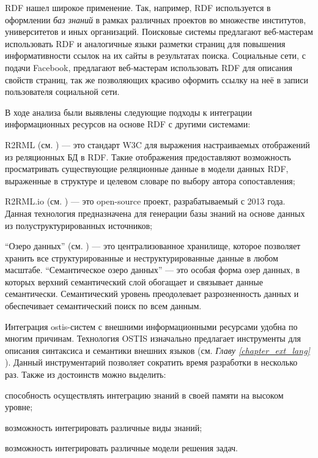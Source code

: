 RDF нашел широкое применение. Так, например, RDF используется в оформлении \textit{баз знаний} в рамках различных проектов во множестве институтов, университетов и иных организаций. Поисковые системы предлагают веб-мастерам использовать RDF и аналогичные языки разметки страниц для повышения информативности ссылок на их сайты в результатах поиска. Социальные сети, с подачи Facebook, предлагают веб-мастерам использовать RDF для описания свойств страниц, так же позволяющих красиво оформить ссылку на неё в записи пользователя социальной сети.

В ходе анализа были выявлены следующие подходы к интеграции информационных ресурсов на основе RDF с другими системами:
\begin{textitemize}
    \item R2RML (см. ) --- это стандарт W3C для выражения настраиваемых отображений из реляционных БД в RDF. Такие отображения предоставляют возможность просматривать существующие реляционные данные в модели данных RDF, выраженные в структуре и целевом словаре по выбору автора сопоставления;
    \item R2RML.io (см. ) --- это open-source проект, разрабатываемый с 2013 года. Данная технология предназначена для генерации базы знаний на основе данных из полуструктурированных источников;
    \item ``Озеро данных'' (см. ) --- это централизованное хранилище, которое позволяет хранить все структурированные и неструктурированные данные в любом масштабе. ``Семантическое озеро данных'' --- это особая форма озер данных, в которых верхний семантический слой обогащает и связывает данные семантически. Семантический уровень преодолевает разрозненность данных и обеспечивает семантический поиск по всем данным.
\end{textitemize}

Интеграция ostis-систем с внешними информационными ресурсами удобна по многим причинам. Технология OSTIS изначально предлагает инструменты для описания синтаксиса и семантики внешних языков (см. \textit{Главу \ref{chapter_ext_lang} }). Данный инструментарий позволяет сократить время разработки в несколько раз. Также из достоинств можно выделить:
\begin{textitemize}
    \item способность осуществлять интеграцию знаний в своей памяти на высоком уровне;
    \item возможность интегрировать различные виды знаний;
    \item возможность интегрировать различные модели решения задач.
\end{textitemize}

